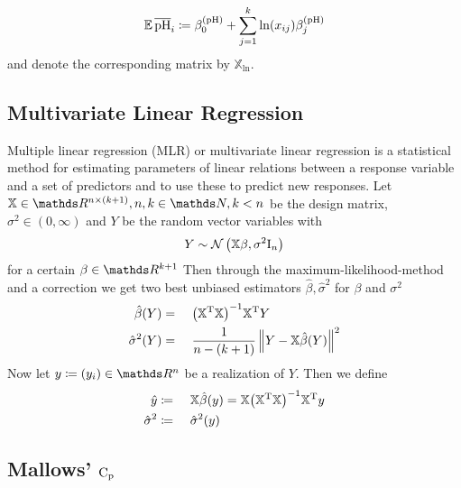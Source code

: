 		\[
			\operatorname{\mathbb{E}} \mathrm{\overline{pH}}_i \coloneqq \beta^{\mathrm{\mathrm{(pH)}}}_0 + \sum_{j = 1}^k{\ln (x_{ij}) \beta^{\mathrm{(pH)}}_j} 
		\]
		and denote the corresponding matrix by $\mathbb{X}_{\ln}$.

	

	\subsection{Multivariate Linear Regression}
	\label{ssec:mlr}
	
		Multiple linear regression (MLR) or multivariate linear regression is a statistical method for estimating parameters of linear relations between a response variable and a set of predictors and to use these to predict new responses.
		Let $\mathbb{X}\in\SR^{n\times(k+1)}, n,k\in\SN,k<n$ be the design matrix, $\sigma^2\in(0,\infty)$ and $Y$ be the random vector variables with
		\[
			Y \sim \mathcal{N}\left( \mathbb{X}\beta,\sigma^2\mathrm{I}_n \right)
		\]
		for a certain $\beta\in\SR^{k+1}$
		Then through the maximum-likelihood-method and a correction we get two best unbiased estimators $\hat{\beta},\hat{\sigma}^2$ for $\beta$ and $\sigma^2$
		\begin{alignat*}{3}
			\hat{\beta}(Y) &=&&\ \inv{\curvb{\transp{\mathbb{X}}\mathbb{X}}}\transp{\mathbb{X}}Y \\
			\hat{\sigma}^2(Y) &=&&\ \frac{1}{n-(k+1)}\norm{Y - \mathbb{X}\hat{\beta}(Y)}^2
		\end{alignat*}
		Now let $y \define (y_i)\in\SR^n$ be a realization of $Y$.
		Then we define
		\begin{alignat*}{3}
			\hat{y} &\coloneqq&&\ \mathbb{X}\hat{\beta}(y) = \mathbb{X}{\left( {\mathbb{X}}^{\mathrm{T}}\mathbb{X} \right)}^{-1}{\mathbb{X}}^{\mathrm{T}}y \\
			\hat{\sigma}^2 &\coloneqq&&\ \hat{\sigma}^2(y)
		\end{alignat*}
	

	\subsection{Mallows' $\mathrm{C_p}$}
	\label{ssec:mallows-C_p}
	
